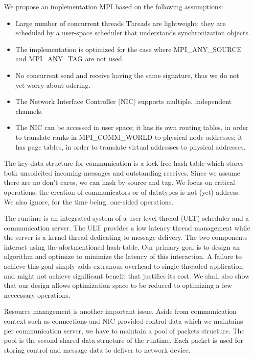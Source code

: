 \documentclass{sig-alternate-05-2015}
\begin{document}
We propose an implementation MPI based on the following assumptions:
\begin{itemize}
  \item Large number of concurrent threads Threads are lightweight; they are
    scheduled by a user-space scheduler that understands synchronization
    objects.
  \item The implementation is optimized for the case where MPI_ANY_SOURCE and MPI_ANY_TAG are not used.
  \item No concurrent send and receive having the same signature, thus we do not yet worry about odering.
  \item The Network Interface Controller (NIC) supports multiple, independent channels.
  \item The NIC can be accessed in user space; it has its own routing tables,
    in order to translate ranks in MPI\_COMM\_WORLD to physical node addresses;
    it has page tables, in order to translate virtual addresses to physical
    addresses.
\end{itemize}

The key data structure for communication is a lock-free hash table which stores
both unsolicited incoming messages and outstanding receives. Since we assume
there are no don't cares, we can hash by source and tag. We focus on critical
operations, the creation of communicators or of datatypes is not (yet)
address. We also ignore, for the time being, one-sided operations.

The runtime is an integrated system of a user-level thread (ULT) scheduler and
a communication server. The ULT provides a low latency thread management while
the server is a kernel-thread dedicating to message delivery. The two
components interact using the afortmentioned hash-table.  Our primary goal is
to design an algorithm and optimize to minimize the latency of this
interaction. A failure to achieve this goal simply adds extranous overhead to
single threaded application and might not achieve significant benefit that
justifies its cost. We shall also show that our design allows optimization space
to be reduced to optimizing a few neccessary operations.

Resource management is another important issue. Aside from communication
context such as connections and NIC-provided control data which we maintains
per communication server, we have to maintain a pool of packets structure. The
pool is the second shared data structure of the runtime.  Each packet is used
for storing control and message data to deliver to network device.
\end{document}
